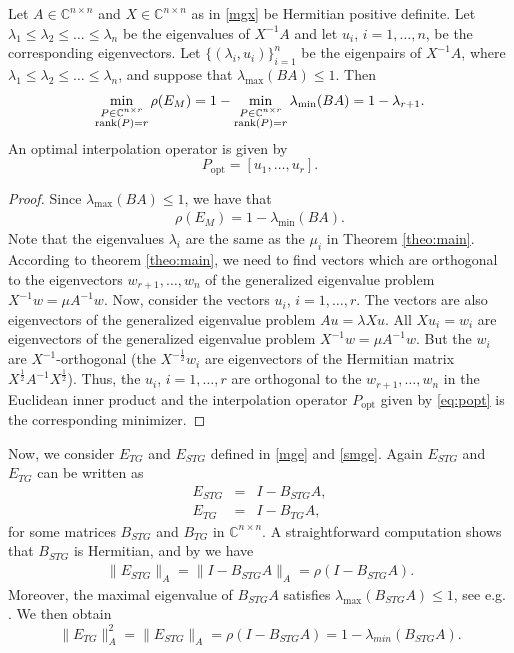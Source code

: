 \documentclass[final]{siamltex}
\newcommand{\uha}{^{\frac{1}{2}}}
\newcommand{\umha}{^{-\frac{1}{2}}}
\newcommand{\innCnn}{\in\mathbb{C}^{n\times n}}
\newcommand{\beqo}{\begin{eqnarray*}}
\newcommand{\beq}{\begin{eqnarray}}
\newcommand{\eeqo}{\end{eqnarray*}}
\newcommand{\eeq}{\end{eqnarray}}
\numberwithin{equation}{section}
\newcommand{\Cnn}{\mathbb{C}^{n \times n}}
\newcommand{\Cnr}{\mathbb{C}^{n \times r}}
\begin{document}
\begin{theorem}\label{theo:main}
Let $A \innCnn$ and $ X \innCnn$ as in \eqref{mgx} be Hermitian positive
definite. Let $
\lambda_1 \leq \lambda_2 \leq \ldots \leq  \lambda_n $
be the  eigenvalues of $X^{-1}A$  and let $u_i$, $i = 1, \ldots, n$, be the
corresponding eigenvectors. Let $\{(\lambda_i, u_i)\}_{i=1}^n$ be the
eigenpairs
of $X^{-1}A$, where $
\lambda_1 \leq \lambda_2 \leq \ldots \leq  \lambda_n $,  and suppose that
$\lambda_{\max}(BA) \leq 1$. Then
\beq
\min_{\substack{P \in \Cnr \\ \rank(P)=r}} \rho(E_{M}) =  1 - \min_{\substack{P
\in \Cnr \\ \rank(P)=r}} \lambda_{\min}(BA) = 1 -
\lambda_{r+1}.
\eeq
An optimal interpolation operator is given by 
\begin{equation} \label{eq:popt}
P_{\mathrm{opt}} = [u_{1}, \ldots , u_r].
\end{equation}
\end{theorem}
\begin{proof}
Since $\lambda_{\max}(BA) \leq 1$,  we have that 
\beqo
\rho(E_{M}) =  1 - \lambda_{\min}(BA).
\eeqo
Note that the eigenvalues $\lambda_i $ are  the same as the $\mu_i$ in Theorem
\ref{theo:main}.
According to theorem  \ref{theo:main}, we need  to find vectors which are
orthogonal
to
the eigenvectors  $w_{r+1}, \ldots , w_n$ of the generalized eigenvalue problem
$X^{-1}w = \mu A^{-1}w$. Now, consider the vectors $u_i$, $i = 1, \ldots, r$.
The vectors are also eigenvectors of the generalized eigenvalue problem  $Au =
\lambda Xu$. All  $Xu_i = w_i$  are  eigenvectors  of the generalized
eigenvalue problem $X^{-1}w = \mu A^{-1}w$. But the $w_i$ are
$X^{-1}$-orthogonal (the $X\umha w_i$ are eigenvectors of the Hermitian matrix
$X\uha A^{-1} X\uha$). Thus, the $u_i$, $i = 1, \ldots, r$ are  orthogonal to
the  $w_{r+1}, \ldots , w_n$ in the Euclidean inner product and the
interpolation operator
$P_{\mathrm{opt}}$ given by \eqref{eq:popt} is the corresponding
minimizer. \end{proof}



Now, we consider $E_{TG}$ and $E_{STG}$  defined in \eqref{mge}  and
\eqref{smge}. Again   $E_{STG}$ and $E_{TG}$    can be written   as
\beqo
E_{STG} & = & I - B_{STG}A, \\
E_{TG} & = & I - B_{TG}A,
\eeqo
for some  matrices $B_{STG}$ and $B_{TG}$ in $\Cnn$. A straightforward
computation shows  that  $B_{STG}$  is Hermitian, and by 
\cite[Lemma 2.11]{Ben01} we have
\beq \label{ben}
\|E_{STG}\|_A = \|I - B_{STG}A\|_A = \rho(I - B_{STG}A).
\eeq
Moreover, the maximal eigenvalue of $B_{STG}A$ satisfies
$\lambda_{\max}(B_{STG}A) \leq 1$, see e.g. \cite[Theorem 3.16]{Vas08}.
We
then
obtain
\[
\|E_{TG}\|_A^2 = \|E_{STG}\|_A = \rho(I - B_{STG}A) = 1 -
\lambda_{min}(B_{STG}A).
\]
\end{document}
